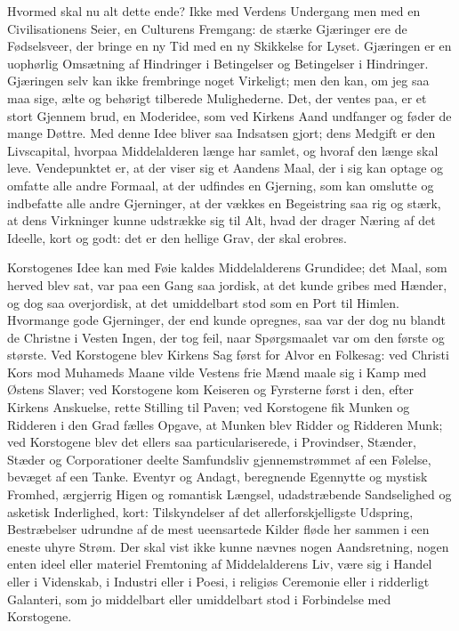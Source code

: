 \documentclass[12pt]{book}
\newcommand{\opage}[1]{\marginnote{\footnotesize\textit{[#1]}}}
\begin{document}
Hvormed skal nu alt dette ende? Ikke med Verdens
Undergang men med en Civilisationens Seier, en
Culturens Fremgang: de stærke Gjæringer ere de Fødselsveer,
der bringe en ny Tid med en ny Skikkelse for
Lyset. Gjæringen er en uophørlig Omsætning af Hindringer
i Betingelser og Betingelser i Hindringer. Gjæringen
selv kan ikke frembringe noget Virkeligt; men
den kan, om jeg saa maa sige, ælte og behørigt tilberede
Mulighederne. Det, der ventes paa, er et stort Gjennem\-%
\opage{29}\setcounter{footnote}{0}%
brud, en Moderidee, som ved Kirkens Aand undfanger
og føder de mange Døttre. Med denne Idee bliver saa
Indsatsen gjort; dens Medgift er den Livscapital, hvorpaa
Middelalderen længe har samlet, og hvoraf den længe
skal leve. Vendepunktet er, at der viser sig et Aandens
Maal, der i sig kan optage og omfatte alle andre Formaal,
at der udfindes en Gjerning, som kan omslutte og
indbefatte alle andre Gjerninger, at der vækkes en Begeistring
saa rig og stærk, at dens Virkninger kunne
udstrække sig til Alt, hvad der drager Næring af det
Ideelle, kort og godt: det er den hellige Grav, der skal
erobres.

Korstogenes Idee kan med Føie kaldes Middelalderens
Grundidee; det Maal, som herved blev sat, var paa
een Gang saa jordisk, at det kunde gribes med Hænder,
og dog saa overjordisk, at det umiddelbart stod som en
Port til Himlen. Hvormange gode Gjerninger, der end
kunde opregnes, saa var der dog nu blandt de Christne
i Vesten Ingen, der tog feil, naar Spørgsmaalet var om
den første og største. Ved Korstogene blev Kirkens
Sag først for Alvor en Folkesag: ved Christi Kors mod
Muhameds Maane vilde Vestens frie Mænd maale sig i
Kamp med Østens Slaver; ved Korstogene kom Keiseren
og Fyrsterne først i den, efter Kirkens Anskuelse, rette
Stilling til Paven; ved Korstogene fik Munken og Ridderen
i den Grad fælles Opgave, at Munken blev Ridder
og Ridderen Munk; ved Korstogene blev det ellers saa
particulariserede, i Provindser, Stænder, Stæder og Corporationer
deelte Samfundsliv gjennemstrømmet af een
Følelse, bevæget af een Tanke. Eventyr og Andagt,
beregnende Egennytte og mystisk Fromhed, ærgjerrig
Higen og romantisk Længsel, udadstræbende Sandselighed
og asketisk Inderlighed, kort: Tilskyndelser af det allerforskjelligste
Udspring, Bestræbelser udrundne af de
\opage{30}\setcounter{footnote}{0}%
mest ueensartede Kilder fløde her sammen i een eneste
uhyre Strøm. Der skal vist ikke kunne nævnes nogen
Aandsretning, nogen enten ideel eller materiel Fremtoning
af Middelalderens Liv, være sig i Handel eller i Videnskab,
i Industri eller i Poesi, i religiøs Ceremonie eller i
ridderligt Galanteri, som jo middelbart eller umiddelbart
stod i Forbindelse med Korstogene.
\end{document}
